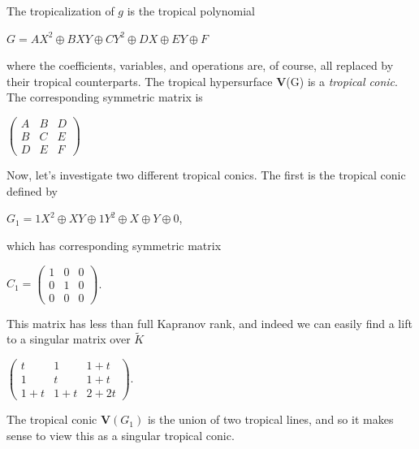 \documentclass{article}
\begin{document}
The tropicalization of $g$ is the tropical polynomial
\begin{center}
  $G = AX^{2} \oplus BXY \oplus CY^{2} \oplus DX \oplus EY \oplus F$
\end{center}
where the coefficients, variables, and operations are, of course, all replaced by their tropical counterparts. The tropical hypersurface \textbf{V}(G) is a \emph{tropical conic}. The corresponding symmetric matrix is
\begin{center}
  $\left(\begin{array}{ccc} A & B & D \\ B & C & E \\ D & E & F \end{array}\right)$
\end{center}

Now, let's investigate two different tropical conics. The first is the tropical conic defined by
\begin{center}
  $G_{1} = 1X^{2} \oplus XY \oplus 1Y^{2} \oplus X \oplus Y \oplus 0$,
\end{center}
which has corresponding symmetric matrix
\begin{center}
  $C_{1} = \left(\begin{array}{ccc} 1 & 0 & 0 \\ 0 & 1 & 0 \\ 0 & 0 & 0 \end{array}\right)$.
\end{center}
This matrix has less than full Kapranov rank, and indeed we can easily find a lift to a singular matrix over $\tilde{K}$
\begin{center}
  $\left(\begin{array}{ccc} t & 1 & 1+t \\ 1 & t & 1+t \\ 1+t & 1+t & 2+2t \end{array}\right)$.
\end{center}
The tropical conic $\textbf{V}(G_{1})$ is the union of two tropical lines, and so it makes sense to view this as a singular tropical conic.
\end{document}
